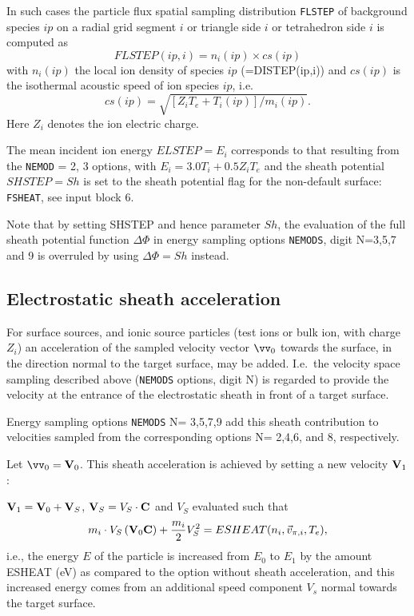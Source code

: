 In such cases the particle flux  spatial sampling distribution
\lstinline|FLSTEP| of background species $ip$ on a radial grid segment $i$
or triangle side $i$ or tetrahedron side $i$ is computed as
\begin{equation}
  FLSTEP(ip,i)=n_i(ip) \times cs(ip)
\end{equation}
with $n_i(ip)$ the local ion
density of species $ip$ (=DISTEP(ip,i)) and $cs(ip)$ is the isothermal acoustic
speed of ion species $ip$, i.e.
\begin{equation}
  cs(ip)=\sqrt{[Z_i
        T_e+T_i(ip)]/m_i(ip)}.
\end{equation}
Here $Z_i$ denotes the ion electric charge.

The mean incident ion energy $ELSTEP=E_i$ corresponds to that resulting from
the \lstinline|NEMOD| = 2, 3 options, with $E_i=3.0 T_i + 0.5 Z_i T_e$
and the sheath potential $SHSTEP= Sh$ is set to the sheath potential flag for
the non-default surface: \lstinline|FSHEAT|, see input block 6.

Note that by setting SHSTEP and hence parameter $Sh$, the evaluation of the
full sheath potential function $\Delta \Phi$ in energy sampling options
\lstinline|NEMODS|, digit N=3,5,7 and 9 is overruled by using $\Delta \Phi
  = Sh$ instead.

\subsection{Electrostatic sheath acceleration}
\label{sec2.7.2}

For surface sources, and ionic source particles (test ions or bulk ion, with
charge $Z_i$) an acceleration of the sampled velocity vector $\vv_0$ towards
the surface, in the direction normal to the target surface, may be added.
I.e.\ the velocity space sampling described above (\lstinline|NEMODS|
options, digit N) is regarded to provide the velocity at the entrance of the
electrostatic sheath in front of a target surface.

Energy sampling options \lstinline|NEMODS| N= 3,5,7,9 add this sheath
contribution to velocities sampled from the corresponding options N= 2,4,6, and
8, respectively.

Let $\vv_0=\vV_0$.
This sheath acceleration is achieved by setting a new velocity $\mathbf{V}_1$:

${\mathbf{V}}_1 = {\mathbf{V}}_0   + {\mathbf{V}}_S$, ${\mathbf{V}}_S = V_S \cdot	\mathbf{C} $ and $V_S$
evaluated such that
\begin{equation}
  m_i	 \cdot	  V_S \left ( {\mathbf{V}}_0
  \mathbf{C} \right )   +   \frac{m_i}{2} V_S^2 = ESHEAT(n_i,{\vec{v}}_{\pi,i},T_e),
\end{equation}
i.e., the energy $E$ of the particle is increased from $E_0$ to
$E_1$ by the amount ESHEAT (\si{\electronvolt}) as compared to the option
without sheath acceleration, and this increased energy comes from an additional
speed component $V_s$ normal towards the target surface.

